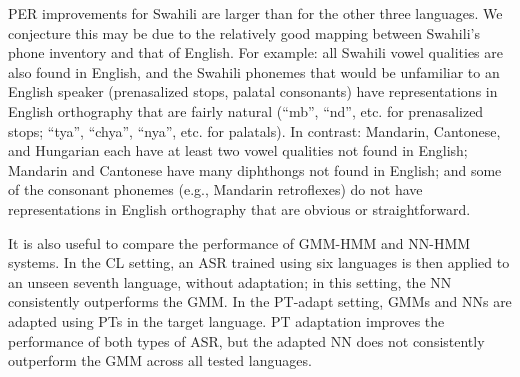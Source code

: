 PER improvements for Swahili are larger than for the other three
languages. %
We conjecture this may be due to the relatively good mapping between
Swahili's phone inventory and that of English. For example: all Swahili
vowel qualities are also found in English, and the Swahili phonemes 
that would be unfamiliar to an English speaker (prenasalized stops, 
palatal consonants) have representations in English orthography that are 
fairly natural (``mb'', ``nd'', etc. for prenasalized stops; ``tya'', 
``chya'', ``nya'', etc. for palatals). In contrast: Mandarin, 
Cantonese, and Hungarian each have at least two vowel qualities not 
found in English; Mandarin and 
Cantonese have many diphthongs not found in English; and some of the 
consonant phonemes (e.g., Mandarin retroflexes) do not have 
representations in English orthography that are obvious or 
straightforward. %

It is also useful to compare the performance of GMM-HMM and NN-HMM
systems.  In the {\sc CL} setting, an ASR trained
using six languages is then applied to an unseen seventh language,
without adaptation; in this setting, the NN consistently outperforms
the GMM.  In the {\sc PT-adapt} setting, GMMs and NNs are
adapted using PTs in the target language.  PT adaptation improves the
performance of both types of ASR, but the
adapted NN does not consistently outperform the GMM across all
tested languages.

